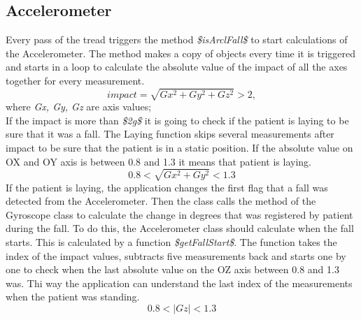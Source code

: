 \documentclass[conference,12pt]{IEEETran}
\begin{document}
\subsection{Accelerometer}
Every pass of the tread triggers the method \textit{\$isArclFall\$} to start calculations of the Accelerometer. The method makes a copy of objects every time it is triggered and starts in a loop to calculate the absolute value of the impact of all the axes together for every measurement.
$$ impact = \sqrt{Gx^2 + Gy^2 + Gz^2} > 2,$$ 
where \textit{Gx, Gy, Gz} are axis values; \\
If the impact is more than \textit{\$2g\$} it is going to check if the patient is laying to be sure that it was a fall. The Laying function skips several measurements after impact to be sure that the patient is in a static position. If the absolute value on OX and OY axis is between 0.8 and 1.3 it means that patient is laying.
$$ 0.8 < \sqrt{Gx^2 + Gy^2} < 1.3 $$
If the patient is laying, the application changes the first flag that a fall was detected from the Accelerometer. Then the class calls the method of the Gyroscope class to calculate the change in degrees that was registered by patient during the fall. To do this, the Accelerometer class should calculate when the fall starts. This is calculated by a function \textit{\$getFallStart\$}. The function takes the index of the impact values, subtracts five measurements back and starts one by one to check when the last absolute value on the OZ axis between 0.8 and 1.3 was. Thi way the application can understand the last index of the measurements when the patient was standing.
$$ 0.8 < \left|Gz\right| < 1.3 $$
\end{document}
